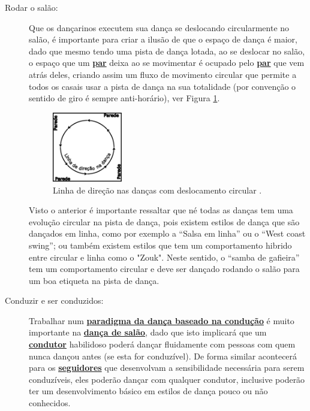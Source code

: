 \begin{description}

\item[Rodar o salão:] Que os dançarinos executem sua dança se deslocando circularmente no salão, 
é importante para criar a ilusão de que o espaço de dança é maior, dado que mesmo
tendo uma pista de dança lotada, ao se deslocar no salão, o espaço que um
\hyperref[def:Par]{\textbf{par}} deixa ao se movimentar é ocupado pelo \hyperref[def:Par]{\textbf{par}} que vem atrás deles, criando 
assim um fluxo de movimento circular que permite a todos os casais usar a pista de dança
na sua totalidade (por convenção o sentido de giro é sempre anti-horário), ver Figura \ref{fig:giro-antihorario1}.
\begin{figure}[h]
  \centering
    \includegraphics[width=0.3\textwidth]{chapters/cap-normas/circular-antihorario.eps}
\caption{Linha de direção nas danças com  deslocamento circular \cite[pp. 20]{freitas1959danca}.}
\label{fig:giro-antihorario1}
\end{figure}
Visto o anterior é importante ressaltar que né todas as danças tem
uma evolução circular na pista de dança, pois existem estilos de dança que são dançados em linha,
como por exemplo a ``Salsa em linha'' ou o ``West coast swing''; ou também existem estilos que
tem um comportamento hibrido entre circular e linha como o "Zouk". Neste sentido,
o ``samba de gafieira'' tem um comportamento circular e  deve ser dançado
rodando o salão para um boa etiqueta na pista de dança.


\item[Conduzir e ser conduzidos:] Trabalhar num \hyperref[def:ParadigmaConducao]{\textbf{paradigma da dança baseado
na condução}} é muito importante na \hyperref[def:DancaSalao]{\textbf{dança de salão}}, dado que isto implicará
que um \hyperref[def:Condutor]{\textbf{condutor}} habilidoso poderá dançar fluidamente com pessoas com quem nunca dançou
antes (se esta for conduzível). De forma similar acontecerá para os \hyperref[def:Seguidor]{\textbf{seguidores}} que desenvolvam
a sensibilidade necessária para serem conduzíveis, eles poderão dançar com qualquer
condutor, inclusive poderão ter um desenvolvimento básico em estilos de dança pouco ou não conhecidos.


\end{description}
